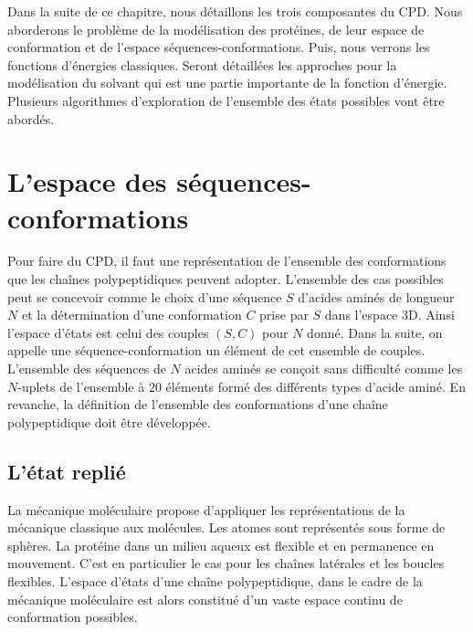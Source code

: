 Dans la suite de ce chapitre, nous détaillons les trois composantes du CPD. Nous aborderons le problème de la modélisation des protéines, de leur espace de conformation et de l'espace séquences-conformations. Puis, nous verrons les fonctions d'énergies classiques. Seront détaillées les approches pour la modélisation du solvant qui est une partie importante de la fonction d'énergie. Plusieurs algorithmes d'exploration de l'ensemble des états possibles vont être abordés.  

\section{L'espace des séquences-conformations}
Pour faire du CPD, il faut une représentation de l'ensemble des conformations que les chaînes polypeptidiques peuvent adopter. L'ensemble des cas possibles peut se concevoir comme le choix d'une séquence $S$ d'acides aminés de longueur $N$ et la détermination d'une conformation $C$ prise par $S$ dans l'espace 3D. Ainsi l'espace d'états est celui des couples $(S,C)$ pour $N$ donné. Dans la suite, on appelle une séquence-conformation un élément de cet ensemble de couples. L'ensemble des séquences de $N$ acides aminés se conçoit sans difficulté comme les $N$-uplets de l'ensemble à $20$ éléments formé des différents types d'acide aminé. En revanche, la définition de l'ensemble des conformations d'une chaîne polypeptidique doit être développée.

\subsection{L'état replié }
\label{sec:etatreplie}
La mécanique moléculaire propose d'appliquer les représentations de la mécanique classique aux molécules. Les atomes sont représentés sous forme de sphères. La protéine dans un milieu aqueux est flexible et en permanence en mouvement. C'est en particulier le cas pour les chaînes latérales et les boucles flexibles. L'espace d'états d'une chaîne polypeptidique, dans le cadre de la mécanique moléculaire est alors constitué d'un vaste espace continu de conformation possibles.

